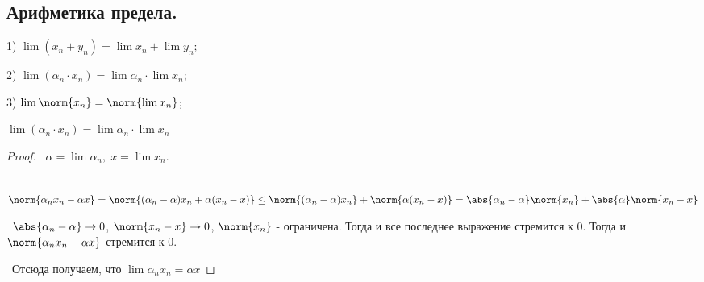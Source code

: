 \subsection*{Арифметика предела.}

\hspace{\parindent}1) $\lim (x_n + y_n) = \lim x_n + \lim y_n$;

2) $\lim (\alpha_n \cdot x_n) = \lim \alpha_n \cdot \lim x_n$;


3) $\lim \norm{x_n} = \norm{\lim x_n}$;

\medskip
\begin{proofexpr*}
$\lim (\alpha_n \cdot x_n) = \lim \alpha_n \cdot \lim x_n$
\end{proofexpr*}

\begin{proof}

\noindent \textbullet~$\alpha = \lim \alpha_n, \; x = \lim x_n$.

\smallskip
\noindent \textbullet~$\norm{\alpha_n x_n - \alpha x} = \norm{(\alpha_n - \alpha) x_n +\alpha (x_n - x)} \le
\norm{(\alpha_n - \alpha) x_n} + \norm{\alpha(x_n - x)} =
\abs{\alpha_n - \alpha}\norm{x_n} + \abs{\alpha} \norm{x_n - x}$ 

\smallskip
\noindent \textbullet~$\abs{\alpha_n - \alpha} \to 0$, $\norm{x_n - x} \to 0$, $\norm{x_n}$ - ограничена. Тогда и все последнее выражение стремится к 0. Тогда и $\norm{\alpha_n x_n - \alpha x}$ стремится к 0.

\smallskip 
\noindent \textbullet~Отсюда получаем, что $\lim \alpha_n x_n = \alpha x$

\end{proof}

